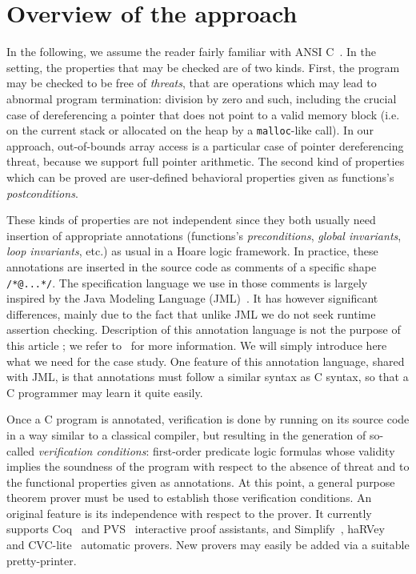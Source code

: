 \section{Overview of the \caduceus{} approach}
\label{sec:overview}

In the following, we assume the reader fairly familiar with ANSI
C~\cite{KR88}.  In the \caduceus{} setting, the properties that may be
checked are of two kinds. First, the program may be checked to be free
of \emph{threats}, that are operations which may lead to abnormal
program termination: division by zero and such, including the crucial
case of dereferencing a pointer that does not point to a valid memory
block (i.e. on the current stack or allocated on the heap by a
\texttt{malloc}-like call). In our approach, out-of-bounds array
access is a particular case of pointer dereferencing threat, because
we support full pointer arithmetic.  The second kind of properties
which can be proved are user-defined behavioral properties given as
functions's \emph{postconditions}.

These kinds of properties are not independent since they both usually
need insertion of appropriate annotations (functions's
\emph{preconditions}, \emph{global invariants}, \emph{loop
  invariants}, etc.) as usual in a Hoare logic framework.  In
practice, these annotations are inserted in the source code as
comments of a specific shape \verb!/*@...*/!. The specification
language we use in those comments is largely inspired by the Java
Modeling Language (JML)~\cite{leavens00jml}. It has however
significant differences, mainly due to the fact that unlike JML we do
not seek runtime assertion checking. Description of this annotation
language is not the purpose of this article ; we refer
to~\cite{Caduceus,filliatre04icfem} for more information. We will
simply introduce here what we need for the case study.
One feature of this annotation language, shared with JML, is that
annotations must follow a similar syntax as C syntax, so that a C
programmer may learn it quite easily.
 
Once a C program is annotated, verification is done by running
\caduceus{} on its source code in a way similar to a classical
compiler, but resulting in the generation of so-called
\emph{verification conditions}: first-order predicate logic formulas
whose validity implies the soundness of the program with respect to
the absence of threat and to the functional properties given as
annotations. At this point, a general purpose theorem prover must be
used to establish those verification conditions.  An original
\caduceus{} feature is its independence with respect to the prover. It
currently supports Coq~\cite{CoqProofAssistant} and PVS~\cite{PVS}
interactive proof assistants, and Simplify~\cite{simplify},
haRVey~\cite{ranise03harvey} and CVC-lite~\cite{barrett04cav}
automatic provers. New provers may easily be added via a suitable
pretty-printer.

